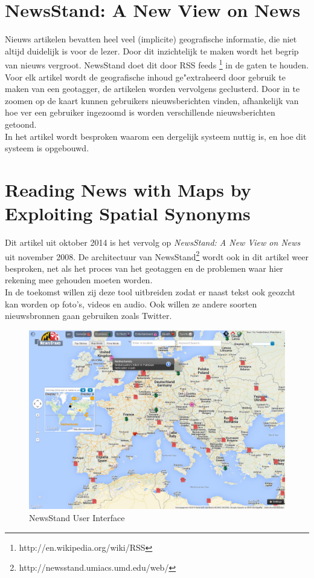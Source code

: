 \documentclass[twoside,openright]{uva-bachelor-thesis}
\begin{document}
	\section{NewsStand: A New View on News \cite{NewsStand2008}}
		Nieuws artikelen bevatten heel veel (implicite) geografische informatie, die niet altijd duidelijk is voor de lezer. Door dit inzichtelijk te maken wordt het begrip van nieuws vergroot. NewsStand doet dit door RSS feeds \footnote{http://en.wikipedia.org/wiki/RSS} in de gaten te houden. Voor elk artikel wordt de geografische inhoud ge"extraheerd door gebruik te maken van een geotagger, de artikelen worden vervolgens geclusterd. Door in te zoomen op de kaart kunnen gebruikers nieuwsberichten vinden, afhankelijk van hoe ver een gebruiker ingezoomd is worden verschillende nieuwsberichten getoond.
		\\[0.5cm]
		In het artikel wordt besproken waarom een dergelijk systeem nuttig is, en hoe dit systeem is opgebouwd.
	\section{Reading News with Maps by Exploiting Spatial Synonyms \cite{RNwMbESS}}
		Dit artikel uit oktober 2014 is het vervolg op \textit{NewsStand: A New View on News} uit november 2008. De architectuur van NewsStand\footnote{http://newsstand.umiacs.umd.edu/web/} wordt ook in dit artikel weer besproken, net als het proces van het geotaggen en de problemen waar hier rekening mee gehouden moeten worden.
		\\[0.5cm]
		In de toekomst willen zij deze tool uitbreiden zodat er naast tekst ook geozcht kan worden op foto's, videos en audio. Ook willen ze andere soorten nieuwsbronnen gaan gebruiken zoals Twitter.
		\begin{figure}[!htb]
			\centering
			\includegraphics[scale=0.3]{./img/NewsStand.png}
			\caption{NewsStand User Interface}
		\end{figure}	
\end{document}
